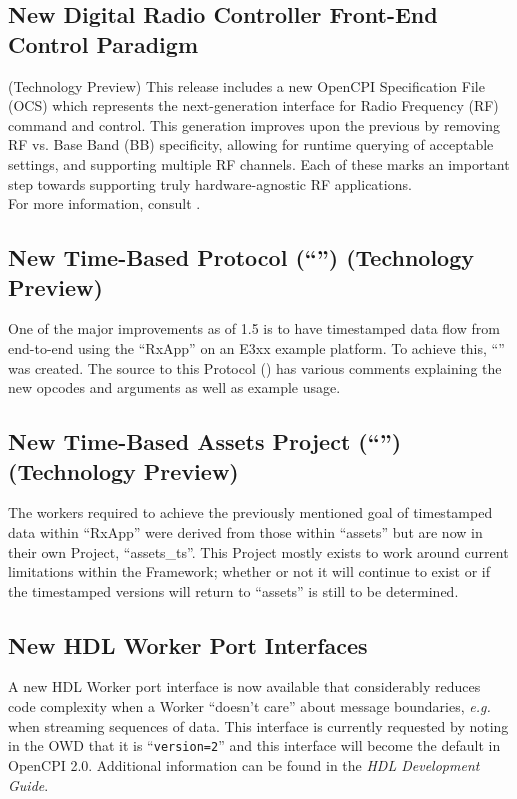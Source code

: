 \subsection{New Digital Radio Controller Front-End Control Paradigm} (Technology Preview) %
\label{sec:15_drc}
This release includes a new OpenCPI Specification File (OCS) which represents the next-generation interface for Radio Frequency (RF) command and control.
This generation improves upon the previous by removing RF vs. Base Band (BB) specificity, allowing for runtime querying of acceptable settings, and supporting multiple RF channels.
Each of these marks an important step towards supporting truly hardware-agnostic RF applications. \\

For more information, consult .
\subsection{New Time-Based Protocol (``'') (Technology Preview)} %
\label{sec:15_protocol}
One of the major improvements as of 1.5 is to have timestamped data flow from end-to-end using the ``RxApp'' on an E3xx example platform. To achieve this, ``'' was created. The source to this Protocol () has various comments explaining the new opcodes and arguments as well as example usage.
\subsection{New Time-Based Assets Project (``'') (Technology Preview)} %
\label{sec:15_assets_ts}
The workers required to achieve the previously mentioned goal of timestamped data within ``RxApp'' were derived from those within ``assets'' but are now in their own Project, ``assets\_ts''. This Project mostly exists to work around current limitations within the Framework; whether or not it will continue to exist or if the timestamped versions will return to ``assets'' is still to be determined.

\subsection{New HDL Worker Port Interfaces} %
\label{sec:15_smart_wrappers}
A new HDL Worker port interface is now available that considerably reduces code complexity when a Worker ``doesn't care'' about message boundaries, \textit{e.g.} when streaming sequences of data. This interface is currently requested by noting in the OWD that it is ``\texttt{version=2}'' and this interface will become the default in OpenCPI 2.0. Additional information can be found in the \textit{HDL Development Guide}.

